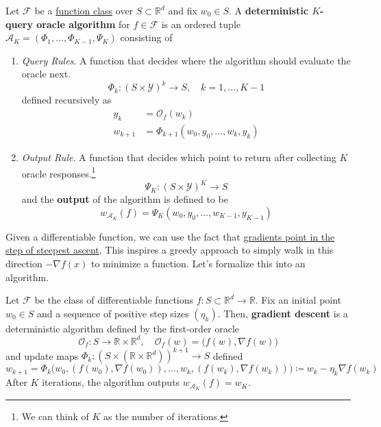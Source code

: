 \begin{definition}[Algorithm]
  \label{def:algorithm}
	Let $\mathcal{F}$ be a \hyperref[def:function-class]{function class} over $S \subset \mathbb{R}^d$ and fix $w_0 \in S$. A \textbf{deterministic $K$-query oracle algorithm} for $f \in \mathcal{F}$ is an ordered tuple $\mathcal{A}_K = (\Phi_1, \ldots, \Phi_{K-1}, \Psi_K)$ consisting of 
	\begin{enumerate}
	  \item \textit{Query Rules}. A function that decides where the algorithm should evaluate the oracle next. 
			\begin{equation}
				\Phi_k : (S \times \mathcal{Y})^k \to S, \quad k = 1, \ldots, K-1
			\end{equation}
			defined recursively as 
			\begin{align}
				y_k & = \mathcal{O}_f (w_k) \\ 
				w_{k+1} & = \Phi_{k+1} (w_0, y_0, \ldots, w_k, y_k)
			\end{align}

		\item \textit{Output Rule}. A function that decides which point to return after collecting $K$ oracle responses.\footnote{We can think of $K$ as the number of iterations.} 
			\begin{equation}
				\Psi_K : (S \times \mathcal{Y})^K \to S
			\end{equation}
			and the \textbf{output} of the algorithm is defined to be 
			\begin{equation}
				w_{\mathcal{A}_K} (f) = \Psi_K (w_0, y_0, \ldots, w_{K-1}, y_{K-1})
			\end{equation}
	\end{enumerate}
\end{definition}

Given a differentiable function, we can use the fact that \hyperref[mv-thm:gradient_increase]{gradients point in the step of steepest ascent}. This inspires a greedy approach to simply walk in this direction $-\nabla f(x)$ to minimize a function. Let's formalize this into an algorithm. 

\begin{definition}
	\label{def:gradient_descent}
	Let $\mathcal{F}$ be the class of differentiable functions $f: S \subset \mathbb{R}^d \to \mathbb{R}$. Fix an initial point $w_0 \in S$ and a sequence of positive step sizes $(\eta_k)$. Then, \textbf{gradient descent} is a deterministic algorithm defined by the first-order oracle
	\begin{equation}
		\mathcal{O}_f : S \to \mathbb{R} \times \mathbb{R}^d, \quad \mathcal{O}_f (w) = \big( f(w), \nabla f(w) \big)
	\end{equation}
	and update maps $\Phi_k : (S \times (\mathbb{R} \times \mathbb{R}^d))^{k+1} \to S$ defined
	\begin{equation}
		w_{k+1} = \Phi_k \big(w_0, (f(w_0), \nabla f(w_0)), \ldots, w_k, (f(w_k), \nabla f(w_k)) \big) \coloneqq  w_k - \eta_k \nabla f(w_k)
	\end{equation}
	After $K$ iterations, the algorithm outputs $w_{\mathcal{A}_K} (f) = w_K$. 
\end{definition}

